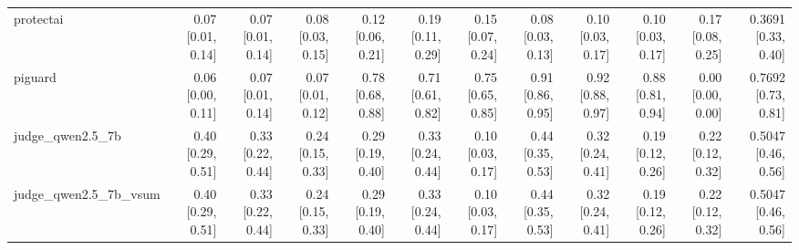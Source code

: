 \begin{tabular}{lrrrrrrrrrrr}
protectai & 0.07 {\scriptsize[0.01, 0.14]} & 0.07 {\scriptsize[0.01, 0.14]} & 0.08 {\scriptsize[0.03, 0.15]} & 0.12 {\scriptsize[0.06, 0.21]} & 0.19 {\scriptsize[0.11, 0.29]} & 0.15 {\scriptsize[0.07, 0.24]} & 0.08 {\scriptsize[0.03, 0.13]} & 0.10 {\scriptsize[0.03, 0.17]} & 0.10 {\scriptsize[0.03, 0.17]} & 0.17 {\scriptsize[0.08, 0.25]} & 0.3691 {\scriptsize[0.33, 0.40]} \\
piguard & 0.06 {\scriptsize[0.00, 0.11]} & 0.07 {\scriptsize[0.01, 0.14]} & 0.07 {\scriptsize[0.01, 0.12]} & 0.78 {\scriptsize[0.68, 0.88]} & 0.71 {\scriptsize[0.61, 0.82]} & 0.75 {\scriptsize[0.65, 0.85]} & 0.91 {\scriptsize[0.86, 0.95]} & 0.92 {\scriptsize[0.88, 0.97]} & 0.88 {\scriptsize[0.81, 0.94]} & 0.00 {\scriptsize[0.00, 0.00]} & 0.7692 {\scriptsize[0.73, 0.81]} \\
judge\_qwen2.5\_7b & 0.40 {\scriptsize[0.29, 0.51]} & 0.33 {\scriptsize[0.22, 0.44]} & 0.24 {\scriptsize[0.15, 0.33]} & 0.29 {\scriptsize[0.19, 0.40]} & 0.33 {\scriptsize[0.24, 0.44]} & 0.10 {\scriptsize[0.03, 0.17]} & 0.44 {\scriptsize[0.35, 0.53]} & 0.32 {\scriptsize[0.24, 0.41]} & 0.19 {\scriptsize[0.12, 0.26]} & 0.22 {\scriptsize[0.12, 0.32]} & 0.5047 {\scriptsize[0.46, 0.56]} \\
judge\_qwen2.5\_7b\_vsum & 0.40 {\scriptsize[0.29, 0.51]} & 0.33 {\scriptsize[0.22, 0.44]} & 0.24 {\scriptsize[0.15, 0.33]} & 0.29 {\scriptsize[0.19, 0.40]} & 0.33 {\scriptsize[0.24, 0.44]} & 0.10 {\scriptsize[0.03, 0.17]} & 0.44 {\scriptsize[0.35, 0.53]} & 0.32 {\scriptsize[0.24, 0.41]} & 0.19 {\scriptsize[0.12, 0.26]} & 0.22 {\scriptsize[0.12, 0.32]} & 0.5047 {\scriptsize[0.46, 0.56]} \\
\bottomrule
\end{tabular}
